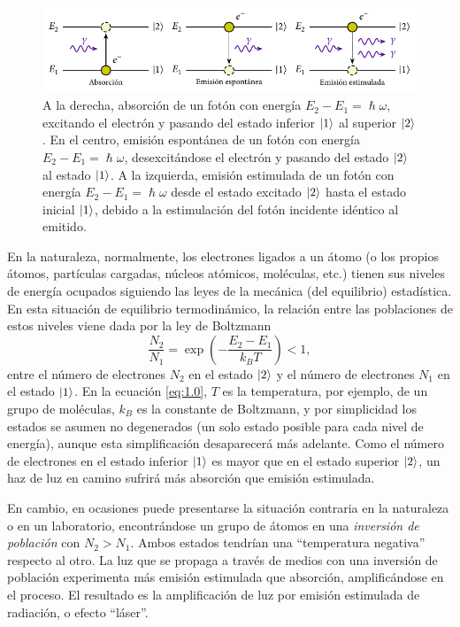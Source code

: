 \begin{figure}[htbp]
  \centering
  \includegraphics[width=\textwidth]{Figuras/ch1_rad_mat.pdf}
  \caption{A la derecha, absorción de un fotón con energía $E_{2} - E_{1} = \hslash \omega$, excitando el electrón y pasando del estado inferior $\left|1\right\rangle$ al superior $\left|2\right\rangle$. En el centro, emisión espontánea de un fotón con energía $E_{2}-E_{1}=\hslash \omega$, desexcitándose el electrón y pasando del estado $\left|2\right\rangle$ al estado $\left|1\right\rangle$. A la izquierda, emisión estimulada de un fotón con energía $E_{2}-E_{1}=\hslash \omega$ desde el estado excitado $\left|2\right\rangle$ hasta el estado inicial $\left|1\right\rangle$, debido a la estimulación del fotón incidente idéntico al emitido.}
  \label{fig:ch1_radmat}
\end{figure}

En la naturaleza, normalmente, los electrones ligados a un átomo (o los propios átomos, partículas cargadas, núcleos atómicos, moléculas, etc.) tienen sus niveles de energía ocupados siguiendo las leyes de la mecánica (del equilibrio) estadística. En esta situación de equilibrio termodinámico, la relación entre las poblaciones de estos niveles viene dada por la ley de Boltzmann \autocite{Feynman2011}
\begin{equation}\label{eq:1.0}
  \frac{N_{2}}{N_{1}} = \exp \left(-\frac{E_{2}-E_{1}}{k_{B}T}\right) < 1, 
\end{equation}
entre el número de electrones $N_{2}$ en el estado $\left|2\right\rangle$ y el número de electrones $N_{1}$ en el estado $\left|1\right\rangle$. En la ecuación \eqref{eq:1.0}, $T$ es la temperatura, por ejemplo, de un grupo de moléculas, $k_{B}$ es la constante de Boltzmann, y por simplicidad los estados se asumen no degenerados (un solo estado posible para cada nivel de energía), aunque esta simplificación desaparecerá más adelante. Como el número de electrones en el estado inferior $\left|1\right\rangle$ es mayor que en el estado superior $\left|2\right\rangle$, un haz de luz en camino sufrirá más absorción que emisión estimulada.

En cambio, en ocasiones puede presentarse la situación contraria en la naturaleza o en un laboratorio, encontrándose un grupo de átomos en una \emph{inversión de población} con $N_{2} > N_{1}$. Ambos estados tendrían una \enquote{temperatura negativa} respecto al otro. La luz que se propaga a través de medios con una inversión de población experimenta más emisión estimulada que absorción, amplificándose en el proceso. El resultado es la amplificación de luz por emisión estimulada de radiación, o efecto \enquote{láser}.

